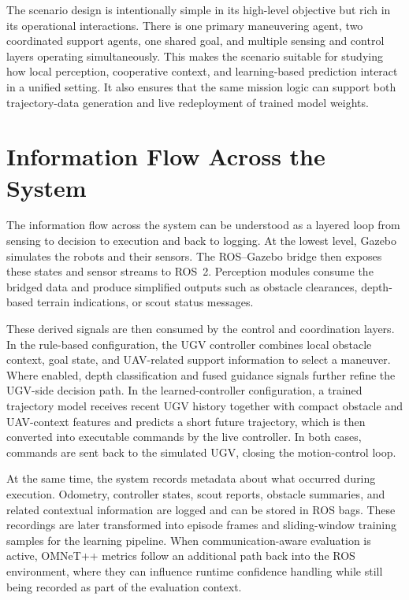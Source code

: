 The scenario design is intentionally simple in its high-level objective but rich in its operational interactions. There is one primary maneuvering agent, two coordinated support agents, one shared goal, and multiple sensing and control layers operating simultaneously. This makes the scenario suitable for studying how local perception, cooperative context, and learning-based prediction interact in a unified setting. It also ensures that the same mission logic can support both trajectory-data generation and live redeployment of trained model weights.

\section{Information Flow Across the System}

The information flow across the system can be understood as a layered loop from sensing to decision to execution and back to logging. At the lowest level, Gazebo simulates the robots and their sensors. The ROS--Gazebo bridge then exposes these states and sensor streams to ROS~2. Perception modules consume the bridged data and produce simplified outputs such as obstacle clearances, depth-based terrain indications, or scout status messages.

These derived signals are then consumed by the control and coordination layers. In the rule-based configuration, the UGV controller combines local obstacle context, goal state, and UAV-related support information to select a maneuver. Where enabled, depth classification and fused guidance signals further refine the UGV-side decision path. In the learned-controller configuration, a trained trajectory model receives recent UGV history together with compact obstacle and UAV-context features and predicts a short future trajectory, which is then converted into executable commands by the live controller. In both cases, commands are sent back to the simulated UGV, closing the motion-control loop.

At the same time, the system records metadata about what occurred during execution. Odometry, controller states, scout reports, obstacle summaries, and related contextual information are logged and can be stored in ROS bags. These recordings are later transformed into episode frames and sliding-window training samples for the learning pipeline. When communication-aware evaluation is active, OMNeT++ metrics follow an additional path back into the ROS environment, where they can influence runtime confidence handling while still being recorded as part of the evaluation context.

